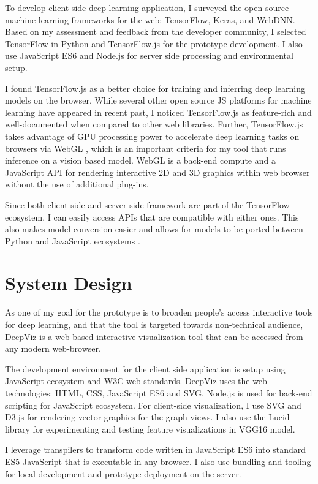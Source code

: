 To develop client-side deep learning application, I surveyed the open source machine learning frameworks for the web: TensorFlow, Keras, and WebDNN. Based on my assessment and feedback from the developer community, I selected TensorFlow in Python and TensorFlow.js for the prototype development. I also use JavaScript ES6 and Node.js for server side processing and environmental setup.

I found TensorFlow.js as a better choice for training and inferring deep learning models on the browser. While several other open source JS platforms for machine learning have appeared in recent past, I noticed TensorFlow.js as feature-rich and well-documented when compared to other web libraries. Further, TensorFlow.js takes advantage of GPU processing power to accelerate deep learning tasks on browsers via WebGL \cite{Ma2019}, which is an important criteria for my tool that runs inference on a vision based model. WebGL is a back-end compute and a JavaScript API for rendering interactive 2D and 3D graphics within web browser without the use of additional plug-ins.

Since both client-side and server-side framework are part of the TensorFlow ecosystem, I can easily access APIs that are compatible with either ones. This also makes model conversion easier and allows for models to be ported between Python and JavaScript ecosystems \cite{Smilkov2019}.

\section{System Design}

As one of my goal for the prototype is to broaden people's access interactive tools for deep learning, and that the tool is targeted towards non-technical audience, DeepViz is a web-based interactive visualization tool that can be accessed from any modern web-browser. 

The development environment for the client side application is setup using JavaScript ecosystem and W3C web standards. DeepViz uses the web technologies: HTML, CSS, JavaScript ES6 and SVG. Node.js is used for back-end scripting for JavaScript ecosystem. For client-side visualization, I use SVG and D3.js for rendering vector graphics for the graph views. I also use the Lucid library for experimenting and testing feature visualizations in VGG16 model.

I leverage transpilers to transform code written in JavaScript ES6 into standard ES5 JavaScript that is executable in any browser. I also use bundling and tooling for local development and prototype deployment on the server.

